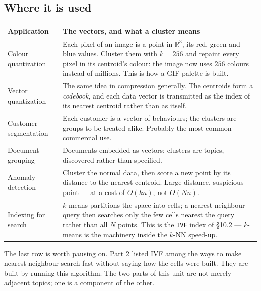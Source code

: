 \documentclass[11pt]{article}
\theoremstyle{plain}
\theoremstyle{definition}
\theoremstyle{remark}
\newcommand{\R}{\mathbb{R}}
\begin{document}
\subsection{Where it is used}
\begin{center}
\renewcommand{\arraystretch}{1.4}
\begin{tabular}{@{}l >{\raggedright\arraybackslash}p{9.4cm}@{}}
\toprule
\textbf{Application} & \textbf{The vectors, and what a cluster means} \\
\midrule
Colour quantization
  & Each pixel of an image is a point in $\R^{3}$, its red, green and blue
    values. Cluster them with $k=256$ and repaint every pixel in its centroid's
    colour: the image now uses $256$ colours instead of millions. This is how a
    GIF palette is built. \\
Vector quantization
  & The same idea in compression generally. The centroids form a
    \emph{codebook}, and each data vector is transmitted as the index of its
    nearest centroid rather than as itself. \\
Customer segmentation
  & Each customer is a vector of behaviours; the clusters are groups to be
    treated alike. Probably the most common commercial use. \\
Document grouping
  & Documents embedded as vectors; clusters are topics, discovered rather than
    specified. \\
Anomaly detection
  & Cluster the normal data, then score a new point by its distance to the
    nearest centroid. Large distance, suspicious point --- at a cost of
    $O(kn)$, not $O(Nn)$. \\
Indexing for search
  & $k$-means partitions the space into cells; a nearest-neighbour query then
    searches only the few cells nearest the query rather than all $N$ points.
    This is the \texttt{IVF} index of \S10.2 --- $k$-means is the machinery
    inside the $k$-NN speed-up. \\
\bottomrule
\end{tabular}
\end{center}

\noindent The last row is worth pausing on. Part 2 listed IVF among the ways to
make nearest-neighbour search fast without saying how the cells were built. They
are built by running this algorithm. The two parts of this unit are not merely
adjacent topics; one is a component of the other.

\end{document}
